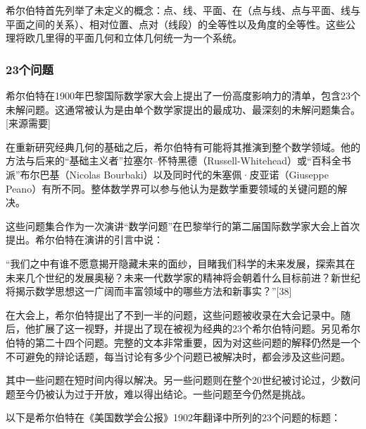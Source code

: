 希尔伯特首先列举了未定义的概念：点、线、平面、在（点与线、点与平面、线与平面之间的关系）、相对位置、点对（线段）的全等性以及角度的全等性。这些公理将欧几里得的平面几何和立体几何统一为一个系统。
\subsubsection{23个问题}
希尔伯特在1900年巴黎国际数学家大会上提出了一份高度影响力的清单，包含23个未解问题。这通常被认为是由单个数学家提出的最成功、最深刻的未解问题集合。[来源需要]  

在重新研究经典几何的基础之后，希尔伯特有可能将其推演到整个数学领域。他的方法与后来的“基础主义者”拉塞尔–怀特黑德（Russell-Whitehead）或“百科全书派”布尔巴基（Nicolas Bourbaki）以及同时代的朱塞佩·皮亚诺（Giuseppe Peano）有所不同。整体数学界可以参与他认为是数学重要领域的关键问题的解决。

这些问题集合作为一次演讲“数学问题”在巴黎举行的第二届国际数学家大会上首次提出。希尔伯特在演讲的引言中说：

“我们之中有谁不愿意揭开隐藏未来的面纱，目睹我们科学的未来发展，探索其在未来几个世纪的发展奥秘？未来一代数学家的精神将会朝着什么目标前进？新世纪将揭示数学思想这一广阔而丰富领域中的哪些方法和新事实？”[38]

在大会上，希尔伯特提出了不到一半的问题，这些问题被收录在大会记录中。随后，他扩展了这一视野，并提出了现在被视为经典的23个希尔伯特问题。另见希尔伯特的第二十四个问题。完整的文本非常重要，因为对这些问题的解释仍然是一个不可避免的辩论话题，每当讨论有多少个问题已被解决时，都会涉及这些问题。

其中一些问题在短时间内得以解决。另一些问题则在整个20世纪被讨论过，少数问题至今仍被认为过于开放，难以得出结论。一些问题至今仍然是挑战。

以下是希尔伯特在《美国数学会公报》1902年翻译中所列的23个问题的标题：

